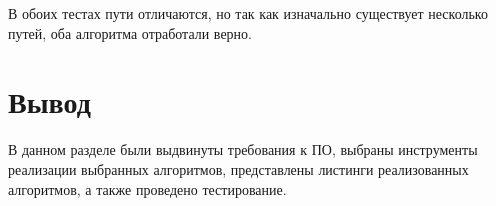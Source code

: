 В обоих тестах пути отличаются, но так как изначально существует несколько путей, оба алгоритма отработали верно.


\section{Вывод}
В данном разделе были выдвинуты требования к ПО, выбраны инструменты реализации выбранных алгоритмов, представлены листинги реализованных алгоритмов, а также проведено тестирование.